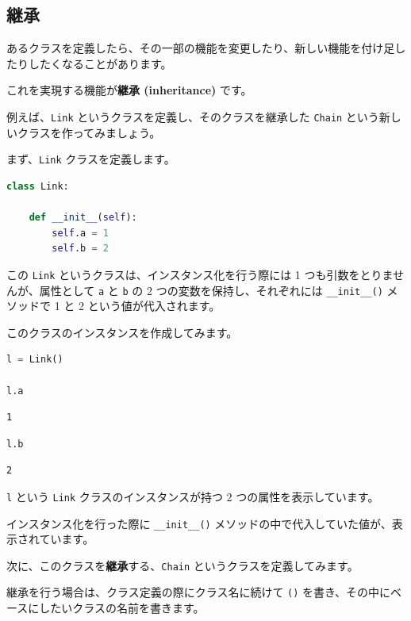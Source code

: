 \subsection{継承}


あるクラスを定義したら、その一部の機能を変更したり、新しい機能を付け足したりしたくなることがあります。

これを実現する機能が\textbf{継承 (inheritance)} です。

例えば、\texttt{Link} というクラスを定義し、そのクラスを継承した \texttt{Chain} という新しいクラスを作ってみましょう。

まず、\texttt{Link} クラスを定義します。


\begin{lstlisting}[style=codecell,language=Python]
class Link:

    def __init__(self):
        self.a = 1
        self.b = 2
\end{lstlisting}

この \texttt{Link} というクラスは、インスタンス化を行う際には 1 つも引数をとりませんが、属性として \texttt{a} と \texttt{b} の 2 つの変数を保持し、それぞれには \texttt{\_\_init\_\_()} メソッドで 1 と 2 という値が代入されます。

このクラスのインスタンスを作成してみます。


\begin{lstlisting}[style=codecell,language=Python]
l = Link()

l.a
\end{lstlisting}

\begin{lstlisting}[style=outputcell]
1
\end{lstlisting}

\begin{lstlisting}[style=codecell,language=Python]
l.b
\end{lstlisting}

\begin{lstlisting}[style=outputcell]
2
\end{lstlisting}

\texttt{l} という \texttt{Link} クラスのインスタンスが持つ 2 つの属性を表示しています。

インスタンス化を行った際に \texttt{\_\_init\_\_()} メソッドの中で代入していた値が、表示されています。


次に、このクラスを\textbf{継承}する、\texttt{Chain} というクラスを定義してみます。

継承を行う場合は、クラス定義の際にクラス名に続けて \texttt{()} を書き、その中にベースにしたいクラスの名前を書きます。

